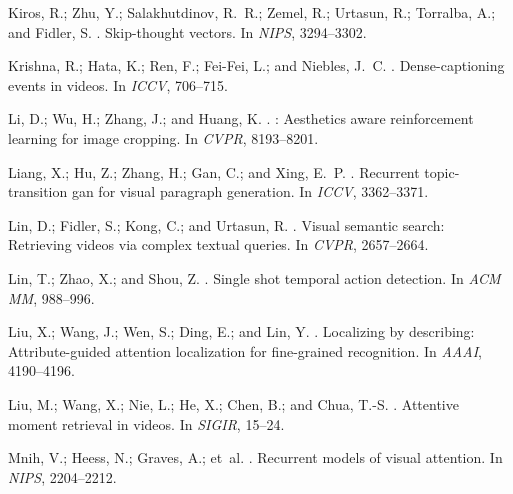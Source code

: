 \documentclass[letterpaper]{article} %
\begin{document}
\begin{thebibliography}{}
Kiros, R.; Zhu, Y.; Salakhutdinov, R.~R.; Zemel, R.; Urtasun, R.; Torralba, A.;
  and Fidler, S.
.
\newblock Skip-thought vectors.
\newblock In {\em NIPS},  3294--3302.

Krishna, R.; Hata, K.; Ren, F.; Fei-Fei, L.; and Niebles, J.~C.
.
\newblock Dense-captioning events in videos.
\newblock In {\em ICCV},  706--715.

Li, D.; Wu, H.; Zhang, J.; and Huang, K.
.
: Aesthetics aware reinforcement learning for image cropping.
\newblock In {\em CVPR},  8193--8201.

Liang, X.; Hu, Z.; Zhang, H.; Gan, C.; and Xing, E.~P.
.
\newblock Recurrent topic-transition gan for visual paragraph generation.
\newblock In {\em ICCV},  3362--3371.

Lin, D.; Fidler, S.; Kong, C.; and Urtasun, R.
.
\newblock Visual semantic search: Retrieving videos via complex textual
  queries.
\newblock In {\em CVPR},  2657--2664.

Lin, T.; Zhao, X.; and Shou, Z.
.
\newblock Single shot temporal action detection.
\newblock In {\em ACM MM},  988--996.

Liu, X.; Wang, J.; Wen, S.; Ding, E.; and Lin, Y.
.
\newblock Localizing by describing: Attribute-guided attention localization for
  fine-grained recognition.
\newblock In {\em AAAI},  4190--4196.

Liu, M.; Wang, X.; Nie, L.; He, X.; Chen, B.; and Chua, T.-S.
.
\newblock Attentive moment retrieval in videos.
\newblock In {\em SIGIR},  15--24.

Mnih, V.; Heess, N.; Graves, A.; et~al.
.
\newblock Recurrent models of visual attention.
\newblock In {\em NIPS},  2204--2212.


\end{thebibliography}
\end{document}

